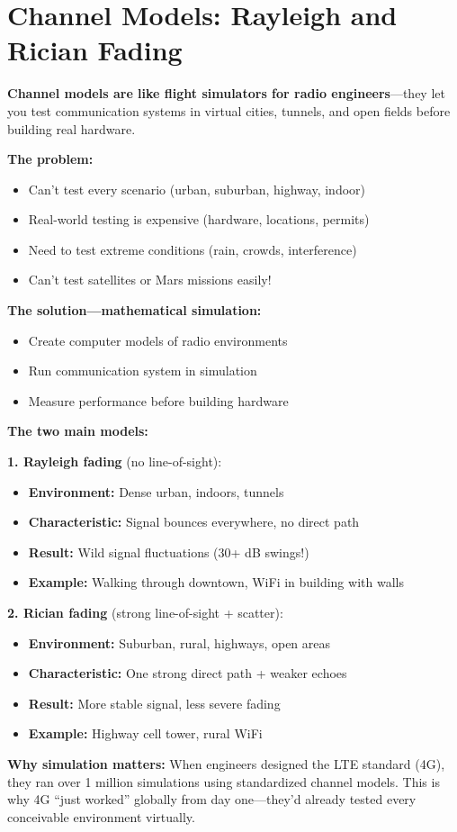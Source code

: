 \chapter{Channel Models: Rayleigh and Rician Fading}
\label{ch:channel-models-rayleigh-rician}

\begin{nontechnical}
\textbf{Channel models are like flight simulators for radio engineers}---they let you test communication systems in virtual cities, tunnels, and open fields before building real hardware.

\textbf{The problem:}
\begin{itemize}
\item Can't test every scenario (urban, suburban, highway, indoor)
\item Real-world testing is expensive (hardware, locations, permits)
\item Need to test extreme conditions (rain, crowds, interference)
\item Can't test satellites or Mars missions easily!
\end{itemize}

\textbf{The solution---mathematical simulation:}
\begin{itemize}
\item Create computer models of radio environments
\item Run communication system in simulation
\item Measure performance before building hardware
\end{itemize}

\textbf{The two main models:}

\textbf{1. Rayleigh fading} (no line-of-sight):
\begin{itemize}
\item \textbf{Environment:} Dense urban, indoors, tunnels
\item \textbf{Characteristic:} Signal bounces everywhere, no direct path
\item \textbf{Result:} Wild signal fluctuations (30+ dB swings!)
\item \textbf{Example:} Walking through downtown, WiFi in building with walls
\end{itemize}

\textbf{2. Rician fading} (strong line-of-sight + scatter):
\begin{itemize}
\item \textbf{Environment:} Suburban, rural, highways, open areas
\item \textbf{Characteristic:} One strong direct path + weaker echoes
\item \textbf{Result:} More stable signal, less severe fading
\item \textbf{Example:} Highway cell tower, rural WiFi
\end{itemize}

\textbf{Why simulation matters:} When engineers designed the LTE standard (4G), they ran over 1 million simulations using standardized channel models. This is why 4G ``just worked'' globally from day one---they'd already tested every conceivable environment virtually.
\end{nontechnical}

